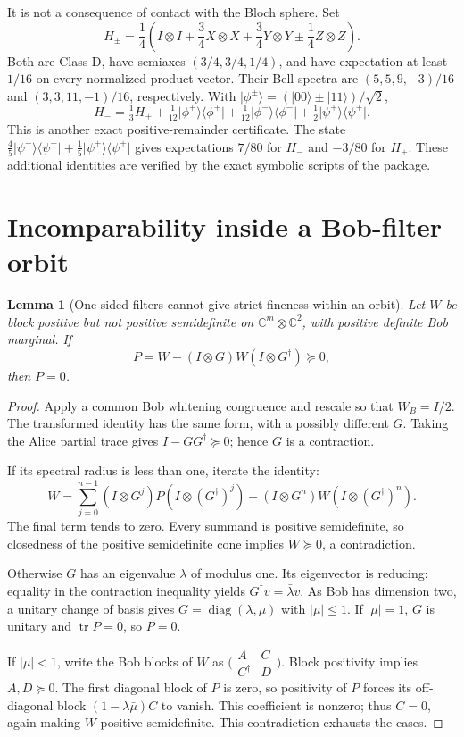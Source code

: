 \documentclass[11pt,a4paper]{article}
\newtheorem{lemma}[theorem]{Lemma}
\theoremstyle{definition}\newtheorem{definition}[theorem]{Definition}
\newcommand{\tr}{\operatorname{tr}}
\newcommand{\C}{\mathbb C}
\newcommand{\ket}[1]{\lvert #1\rangle}
\newcommand{\bra}[1]{\langle #1\rvert}
\newcommand{\proj}[1]{\ket{#1}\bra{#1}}
\newcommand{\XX}{X\otimes X}
\newcommand{\YY}{Y\otimes Y}
\newcommand{\ZZ}{Z\otimes Z}
\newcommand{\II}{I\otimes I}
\theoremstyle{plain}\newtheorem*{theorem*}{Theorem}
\begin{document}
It is not a consequence of contact with the Bloch sphere. Set
\[
 H_\pm=\frac14\left(\II+\frac34\XX+\frac34\YY\pm\frac14\ZZ\right).
\]
Both are Class D, have semiaxes $(3/4,3/4,1/4)$, and have expectation at least $1/16$ on every normalized product vector. Their Bell spectra are $(5,5,9,-3)/16$ and $(3,3,11,-1)/16$, respectively. With $\ket{\phi^\pm}=(\ket{00}\pm\ket{11})/\sqrt2$,
\[
 H_-=\tfrac13H_++\tfrac1{12}\proj{\phi^+}+\tfrac1{12}\proj{\phi^-}+\tfrac12\proj{\psi^+}.
\]
This is another exact positive-remainder certificate. The state $\tfrac45\proj{\psi^-}+\tfrac15\proj{\psi^+}$ gives expectations $7/80$ for $H_-$ and $-3/80$ for $H_+$. These additional identities are verified by the exact symbolic scripts of the package.

\section{Incomparability inside a Bob-filter orbit}

\begin{lemma}[One-sided filters cannot give strict fineness within an orbit]\label{lem:orbit}
Let $W$ be block positive but not positive semidefinite on $\C^m\otimes\C^2$, with positive definite Bob marginal. If
\[
 P=W-(I\otimes G)W(I\otimes G^\dagger)\succeq0,
\]
then $P=0$.
\end{lemma}
\begin{proof}
Apply a common Bob whitening congruence and rescale so that $W_B=I/2$. The transformed identity has the same form, with a possibly different $G$. Taking the Alice partial trace gives $I-GG^\dagger\succeq0$; hence $G$ is a contraction.

If its spectral radius is less than one, iterate the identity:
\[
 W=\sum_{j=0}^{n-1}(I\otimes G^j)P(I\otimes(G^\dagger)^j)
 +(I\otimes G^n)W(I\otimes(G^\dagger)^n).
\]
The final term tends to zero. Every summand is positive semidefinite, so closedness of the positive semidefinite cone implies $W\succeq0$, a contradiction.

Otherwise $G$ has an eigenvalue $\lambda$ of modulus one. Its eigenvector is reducing: equality in the contraction inequality yields $G^\dagger v=\bar\lambda v$. As Bob has dimension two, a unitary change of basis gives $G=\operatorname{diag}(\lambda,\mu)$ with $|\mu|\leq1$. If $|\mu|=1$, $G$ is unitary and $\tr P=0$, so $P=0$.

If $|\mu|<1$, write the Bob blocks of $W$ as $\bigl(\begin{smallmatrix}A&C\\C^\dagger&D\end{smallmatrix}\bigr)$. Block positivity implies $A,D\succeq0$. The first diagonal block of $P$ is zero, so positivity of $P$ forces its off-diagonal block $(1-\lambda\bar\mu)C$ to vanish. This coefficient is nonzero; thus $C=0$, again making $W$ positive semidefinite. This contradiction exhausts the cases.
\end{proof}
\end{document}
